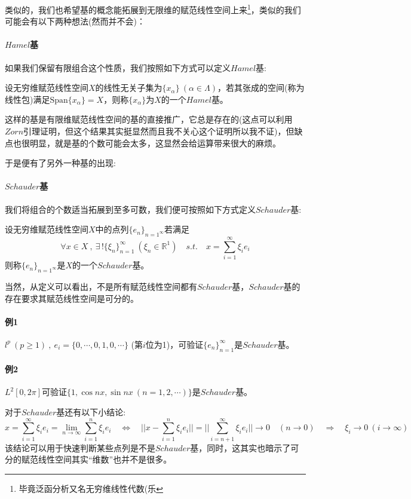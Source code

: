 类似的，我们也希望基的概念能拓展到无限维的赋范线性空间上来\footnote{毕竟泛函分析又名无穷维线性代数(乐}，类似的我们可能会有以下两种想法(然而并不会)：
\paragraph*{$Hamel$基}
如果我们保留有限组合这个性质，我们按照如下方式可以定义$Hamel$基:
\begin{definition}[$Hamel$基]
    设无穷维赋范线性空间$X$的线性无关子集为$\{x_{\alpha}\} \ (\alpha \in \Lambda)$，若其张成的空间(称为线性包)满足$\text{Span}\{x_{\alpha}\}=X$，则称$\{x_{\alpha}\}$为$X$的一个$Hamel$基。
\end{definition}
这样的基是有限维赋范线性空间的基的直接推广，它总是存在的(这点可以利用$Zorn$引理证明，但这个结果其实挺显然而且我不关心这个证明所以我不证)，但缺点也很明显，就是基的个数可能会太多，这显然会给运算带来很大的麻烦。

于是便有了另外一种基的出现:
\paragraph*{$Schauder$基}
我们将组合的个数适当拓展到至多可数，我们便可按照如下方式定义$Schauder$基:
\begin{definition}[$Schauder$基]
    设无穷维赋范线性空间$X$中的点列$\{e_n\}_{n=1^{\infty}}$若满足
    \[\forall x \in X \ , \ \exists \, !\{\xi_n\}_{n=1}^{\infty} \ (\xi_n \in \mathbb{R}^1) \quad s.t. \quad x=\sum_{i=1}^{\infty}\xi_ie_i\]
    则称$\{e_n\}_{n=1^{\infty}}$是$X$的一个$Schauder$基。
\end{definition}
当然，从定义可以看出，不是所有赋范线性空间都有$Schauder$基，$Schauder$基的存在要求其赋范线性空间是可分的。
\paragraph*{例1} \quad $l^p \ (p \geq 1) \ , \ e_i=\{0,\cdots,0,1,0,\cdots\}$ (第$i$位为1)，可验证$\{e_n\}_{n=1}^{\infty}$是$Schauder$基。
\paragraph*{例2} \quad $L^2[0,2\pi]$可验证$\{1,\cos nx,\sin nx \ (n=1,2,\cdots)\}$是$Schauder$基。

对于$Schauder$基还有以下小结论:
\[x=\sum_{i=1}^{\infty}\xi_ie_i=\lim_{n \to \infty}\sum_{i=1}^{n}\xi_ie_i \quad \Leftrightarrow \quad ||x-\sum_{i=1}^n\xi_ie_i||=||\sum_{i=n+1}^{\infty}\xi_ie_i|| \rightarrow 0 \quad (n \rightarrow 0) \quad \Rightarrow \quad \xi_i \rightarrow 0 \ (i \to \infty)\]
该结论可以用于快速判断某些点列是不是$Schauder$基，同时，这其实也暗示了可分的赋范线性空间其实“维数”也并不是很多。
